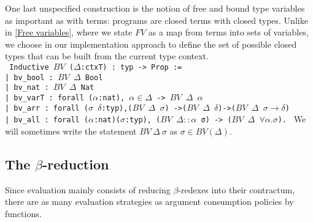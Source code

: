 \documentclass{article}
\begin{document}
     One last unspecified construction is the notion of free and bound type variables as important as with terms: programs are closed terms with closed types. Unlike in \ref{Free variables}, where we state $FV$ as a map from terms into sets of variables, we choose in our implementation approach to define the set of possible closed types that can be built from the current type context.\\
     \label{BV}\texttt{
Inductive $BV$ ($\Delta$:ctxT) : typ -> Prop :=\\
  | bv\_bool : $BV$ $\Delta$ Bool\\
  | bv\_nat : $BV$ $\Delta$ Nat\\
  | bv\_varT : forall ($\alpha$:nat),
                $\alpha\in\Delta$ -> $BV$ $\Delta$ $\alpha$\\
  | bv\_arr : forall ($\sigma$ $\delta$:typ),($BV$ $\Delta$ $\sigma$) ->($BV$ $\Delta$ $\delta$)->($BV$ $\Delta$ $\sigma\rightarrow\delta$)\\
  | bv\_all : forall ($\alpha$:nat)($\sigma$:typ),
                ($BV$ $\Delta::\alpha$ σ) -> ($BV$ $\Delta$ $\forall \alpha.\sigma$).
}
    We will sometimes write the statement $BV \ \Delta \ \sigma$ as $\sigma\in BV(\Delta)$.
    
    \subsection{The $\beta$-reduction}
    Since evaluation mainly consists of reducing $\beta$-redexes into their contractum, there are as many evaluation strategies as argument consumption policies by functions.
\end{document}

